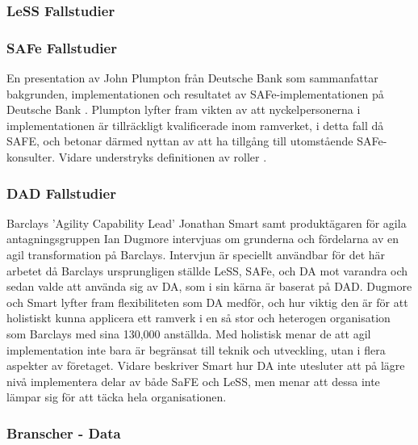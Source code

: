 		
		
		\subsubsection{LeSS Fallstudier}

			
			

		
		\subsubsection{SAFe Fallstudier}

			En presentation av John Plumpton från Deutsche Bank som sammanfattar bakgrunden, implementationen och resultatet av SAFe-implementationen på Deutsche Bank \cite{deutsche_case}. 
			Plumpton lyfter fram vikten av att nyckelpersonerna i implementationen är tillräckligt kvalificerade inom ramverket, i detta fall då SAFE, och betonar därmed nyttan av att ha tillgång till utomstående SAFe-konsulter. 
			Vidare understryks definitionen av roller .
			
			
			
		
		\subsubsection{DAD Fallstudier}
		
			Barclays 'Agility Capability Lead' Jonathan Smart samt produktägaren för agila antagningsgruppen Ian Dugmore intervjuas om grunderna och fördelarna av en agil transformation på Barclays\cite{barclays_interview}. Intervjun är speciellt användbar för det här arbetet då Barclays ursprungligen ställde LeSS, SAFe, och DA mot varandra och sedan valde att använda sig av DA, som i sin kärna är baserat på DAD.
			Dugmore och Smart lyfter fram flexibiliteten som DA medför, och hur viktig den är för att holistiskt kunna applicera ett ramverk i en så stor och heterogen organisation som Barclays med sina 130,000 anställda. Med holistisk menar de att agil implementation inte bara är begränsat till teknik och utveckling, utan i flera aspekter av företaget. Vidare beskriver Smart hur DA inte utesluter att på lägre nivå implementera delar av både SaFE och LeSS, men menar att dessa inte lämpar sig för att täcka hela organisationen.
			
			
		
		\subsubsection{Branscher - Data}
			
